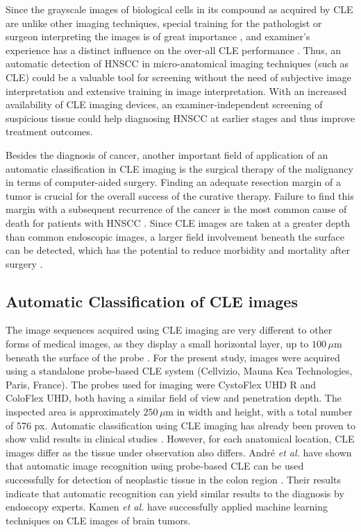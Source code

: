 \documentclass[fleqn,10pt]{wlscirep}
\begin{document}
Since the grayscale images of biological cells in its compound as acquired by CLE are unlike other imaging
techniques, special training for the pathologist or surgeon
interpreting the images is of great importance \cite{Abbaci:2014wn},
and examiner's experience has a distinct influence on the over-all CLE
performance \cite{Neumann:2011tc}. Thus, an automatic detection of
HNSCC in micro-anatomical imaging techniques (such as CLE) could be a valuable tool for screening without
the need of subjective image interpretation and extensive training in image interpretation. With an
increased availability of CLE imaging devices, an examiner-independent screening  of
suspicious tissue could help diagnosing HNSCC at earlier stages and
thus improve treatment outcomes.

Besides the diagnosis of cancer, another important field of application of an automatic classification in CLE imaging is the surgical therapy of the malignancy in terms of computer-aided surgery. Finding an adequate resection margin of a
tumor is crucial for the overall success of the curative
therapy. Failure to find this margin with a subsequent recurrence of the cancer is the most common cause of
death for patients with HNSCC \cite{Nathan:2014ky}. Since CLE images
are taken at a greater depth than common endoscopic images, a larger
field involvement beneath the surface can be detected, which has the
potential to reduce morbidity and mortality after surgery \cite{Nathan:2014ky}.













\subsection{Automatic Classification of CLE images}

The image sequences acquired using CLE imaging are very different to other
forms of medical images, as they display a small horizontal layer,
up to $100\,\mu$m beneath the surface of the probe \cite{Mennone:2017jj}. For the
present study, images were acquired using a standalone probe-based CLE
system (Cellvizio, Mauna Kea Technologies, Paris, France). The probes used for imaging were CystoFlex UHD R and ColoFlex UHD, both having a similar field of view and penetration depth. The
inspected area is approximately $250\,\mu $m in width and height, with
a total number of 576 px. Automatic classification
using CLE imaging has already been proven to show valid results in
clinical studies \cite{Andre:2012kw,Kamen:2016jw,Veronese:2013hb}. However, for each anatomical
location, CLE images differ as the tissue under observation also differs.  Andr\'{e} \textit{et al.} have shown that automatic image recognition
using probe-based CLE can be used successfully
for detection of neoplastic tissue in the colon region \cite{Andre:2012kw}. Their results
indicate that automatic recognition can yield similar results to the
diagnosis by endoscopy experts. Kamen \textit{et al.} have successfully applied machine learning techniques on CLE images of brain tumors. \cite{Kamen:2016jw}
\end{document}
